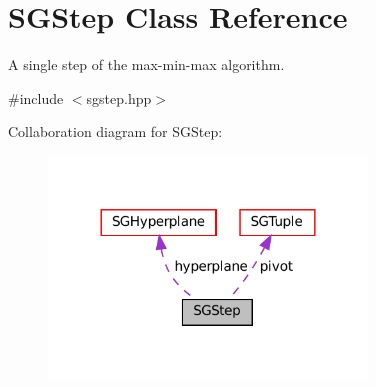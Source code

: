 \hypertarget{classSGStep}{}\section{S\+G\+Step Class Reference}
\label{classSGStep}


A single step of the max-\/min-\/max algorithm.  




{\ttfamily \#include $<$sgstep.\+hpp$>$}



Collaboration diagram for S\+G\+Step\+:
\nopagebreak
\begin{figure}[H]
\begin{center}
\leavevmode
\includegraphics[width=240pt]{classSGStep__coll__graph}
\end{center}
\end{figure}
